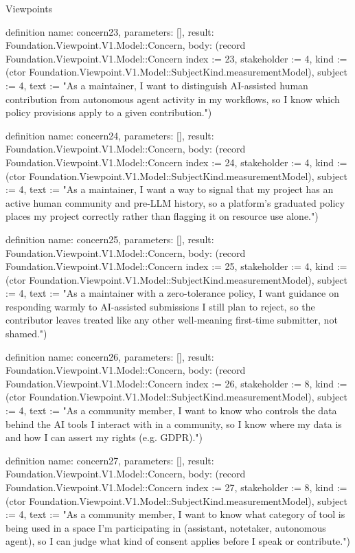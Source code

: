\begin{lexlean}{Viewpoints}
\begin{semanticmodule}
definition{
  name: concern23,
  parameters: [],
  result: Foundation.Viewpoint.V1.Model::Concern,
  body: (record Foundation.Viewpoint.V1.Model::Concern {index := 23, stakeholder := 4, kind := (ctor Foundation.Viewpoint.V1.Model::SubjectKind.measurementModel), subject := 4, text := "As a maintainer, I want to distinguish AI-assisted human contribution from autonomous agent activity in my workflows, so I know which policy provisions apply to a given contribution."})
}

definition{
  name: concern24,
  parameters: [],
  result: Foundation.Viewpoint.V1.Model::Concern,
  body: (record Foundation.Viewpoint.V1.Model::Concern {index := 24, stakeholder := 4, kind := (ctor Foundation.Viewpoint.V1.Model::SubjectKind.measurementModel), subject := 4, text := "As a maintainer, I want a way to signal that my project has an active human community and pre-LLM history, so a platform's graduated policy places my project correctly rather than flagging it on resource use alone."})
}

definition{
  name: concern25,
  parameters: [],
  result: Foundation.Viewpoint.V1.Model::Concern,
  body: (record Foundation.Viewpoint.V1.Model::Concern {index := 25, stakeholder := 4, kind := (ctor Foundation.Viewpoint.V1.Model::SubjectKind.measurementModel), subject := 4, text := "As a maintainer with a zero-tolerance policy, I want guidance on responding warmly to AI-assisted submissions I still plan to reject, so the contributor leaves treated like any other well-meaning first-time submitter, not shamed."})
}

definition{
  name: concern26,
  parameters: [],
  result: Foundation.Viewpoint.V1.Model::Concern,
  body: (record Foundation.Viewpoint.V1.Model::Concern {index := 26, stakeholder := 8, kind := (ctor Foundation.Viewpoint.V1.Model::SubjectKind.measurementModel), subject := 4, text := "As a community member, I want to know who controls the data behind the AI tools I interact with in a community, so I know where my data is and how I can assert my rights (e.g. GDPR)."})
}

definition{
  name: concern27,
  parameters: [],
  result: Foundation.Viewpoint.V1.Model::Concern,
  body: (record Foundation.Viewpoint.V1.Model::Concern {index := 27, stakeholder := 8, kind := (ctor Foundation.Viewpoint.V1.Model::SubjectKind.measurementModel), subject := 4, text := "As a community member, I want to know what category of tool is being used in a space I'm participating in (assistant, notetaker, autonomous agent), so I can judge what kind of consent applies before I speak or contribute."})
}


\end{semanticmodule}
\end{lexlean}
